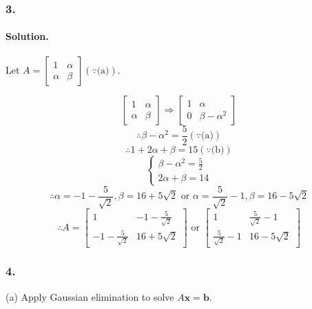 \subsubsection{3.}
\paragraph*{Solution.}
Let $A = \begin{bmatrix}
    1&\alpha\\\alpha & \beta
\end{bmatrix} (\because \text{(a)})$.

$$\begin{bmatrix}
    1&\alpha\\\alpha & \beta
\end{bmatrix} \Rightarrow \begin{bmatrix}
    1&\alpha\\0&\beta-\alpha^2
\end{bmatrix}$$
$$\therefore\beta-\alpha^2=\frac{5}{2} (\because \text{(a)})$$
$$\therefore 1+2\alpha+\beta=15 (\because \text{(b)})$$
$$\begin{cases}
    \beta-\alpha^2=\frac{5}{2}\\
    2\alpha+\beta=14
\end{cases}$$
$$\therefore \alpha = -1-\frac{5}{\sqrt{2}}, \beta = 16 + 5\sqrt{2} \text{  or  } \alpha = \frac{5}{\sqrt{2}}-1, \beta = 16 - 5\sqrt{2}$$
$$\therefore A = \begin{bmatrix}
    1&-1-\frac{5}{\sqrt{2}}\\-1-\frac{5}{\sqrt{2}}&16 + 5\sqrt{2}
\end{bmatrix} \text{  or  } \begin{bmatrix}
    1&\frac{5}{\sqrt{2}}-1\\\frac{5}{\sqrt{2}}-1&16 - 5\sqrt{2}
\end{bmatrix}$$
\newpage
\subsubsection{4.}
(a) Apply Gaussian elimination to solve $A\mathbf{x} = \mathbf{b}$.
